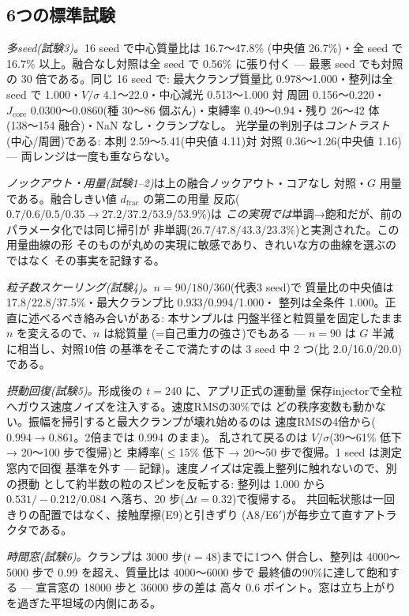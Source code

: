 \documentclass[a4paper,10pt,twocolumn]{ltjsarticle}
\begin{document}
\subsection{6つの標準試験}

\emph{多seed(試験3)。}16 seed で中心質量比は 16.7〜47.8\%
(中央値 26.7\%)・全 seed で 16.7\% 以上。融合なし対照は全 seed で
0.56\% に張り付く — 最悪 seed でも対照の 30 倍である。同じ 16 seed で:
最大クランプ質量比 0.978〜1.000・整列は全 seed で 1.000・$V/\sigma$
4.1〜22.0・中心減光 0.513〜1.000 対 周囲 0.156〜0.220・
$J_{\mathrm{core}}$ 0.0300〜0.0860(種 30〜86 個ぶん)・束縛率
0.49〜0.94・残り 26〜42 体(138〜154 融合)・NaN なし・クランプなし。
光学量の判別子は\emph{コントラスト}(中心/周囲)である: 本則
2.59〜5.41(中央値 4.11)対 対照 0.36〜1.26(中央値 1.16)—
両レンジは一度も重ならない。

\emph{ノックアウト・用量(試験1–2)}は上の融合ノックアウト・コアなし
対照・$G$ 用量である。融合しきい値 $d_{\mathrm{frac}}$ の第二の用量
反応($0.7/0.6/0.5/0.35 \rightarrow 27.2/37.2/53.9/53.9\%$)は
\emph{この実現では}単調→飽和だが、前のパラメータ化では同じ掃引が
非単調($26.7/47.8/43.3/23.3\%$)と実測された。この用量曲線の形
そのものが丸めの実現に敏感であり、きれいな方の曲線を選ぶのではなく
その事実を記録する。

\emph{粒子数スケーリング(試験4)。}$n=90/180/360$(代表3 seed)で
質量比の中央値は 17.8/22.8/37.5\%・最大クランプ比 0.933/0.994/1.000・
整列は全条件 1.000。正直に述べるべき絡み合いがある: 本サンプルは
円盤半径と粒質量を固定したまま $n$ を変えるので、$n$ は総質量
(=自己重力の強さ)でもある — $n=90$ は $G$ 半減に相当し、対照10倍
の基準をそこで満たすのは 3 seed 中 2 つ(比 2.0/16.0/20.0)である。

\emph{摂動回復(試験5)。}形成後の $t=240$ に、アプリ正式の運動量
保存injectorで全粒へガウス速度ノイズを注入する。速度RMSの30\%では
どの秩序変数も動かない。振幅を掃引すると最大クランプが壊れ始めるのは
速度RMSの4倍から($0.994\rightarrow0.861$。2倍までは 0.994 のまま)。
乱されて戻るのは $V/\sigma$(39〜61\% 低下 → 20〜100 步で復帰)と
束縛率($\leq$15\% 低下 → 20〜50 步で復帰。1 seed は測定窓内で回復
基準を外す — 記録)。速度ノイズは定義上整列に触れないので、別の摂動
として約半数の粒のスピンを反転する: 整列は 1.000 から
$0.531/-0.212/0.084$ へ落ち、20 步($\Delta t=0.32$)で復帰する。
共回転状態は一回きりの配置ではなく、接触摩擦(E9)と引きずり
(A8/E6$'$)が毎步立て直すアトラクタである。

\emph{時間窓(試験6)。}クランプは 3000 步($t=48$)までに1つへ
併合し、整列は 4000〜5000 步で 0.99 を超え、質量比は 4000〜6000 步で
最終値の90\%に達して飽和する — 宣言窓の 18000 步と 36000 步の差は
高々 0.6 ポイント。窓は立ち上がりを過ぎた平坦域の内側にある。
\end{document}
